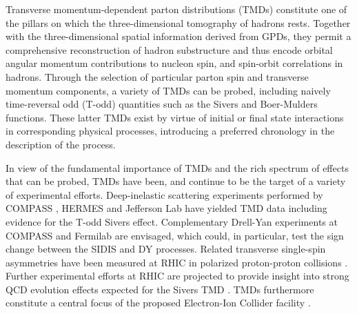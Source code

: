Transverse momentum-dependent parton distributions (TMDs) \cite{Boer:2011fh}
constitute one of the pillars on which the three-dimensional tomography of
hadrons rests. Together with the three-dimensional spatial information
derived from GPDs, they permit a
comprehensive reconstruction of hadron substructure and thus
encode %
orbital angular momentum contributions to nucleon spin, and
spin-orbit correlations in hadrons. Through the selection of
particular parton spin and transverse momentum components, a
variety of TMDs can be probed, including naively time-reversal odd
(T-odd) quantities such as the Sivers and Boer-Mulders functions.
These latter TMDs exist by virtue of initial or final state interactions
in corresponding physical processes, introducing a preferred chronology
in the description of the process.

In view of the fundamental importance of TMDs and the rich spectrum of
effects that can be probed, TMDs have been, and continue to be the
target of a variety of experimental efforts. Deep-inelastic scattering
experiments performed by COMPASS \cite{Alekseev:2008aa,Adolph:2014fjw},
HERMES \cite{Airapetian:2009ae,Airapetian:2013bim} and Jefferson Lab
\cite{Qian:2011py,Avakian:2010ae} have yielded TMD data including evidence
for the T-odd Sivers effect. Complementary Drell-Yan experiments at
COMPASS \cite{Gautheron:2010wva} and Fermilab \cite{Brown:2014sea} are
envisaged, which could, in particular, test the sign change between
the SIDIS and DY processes. Related transverse single-spin
asymmetries have been measured at RHIC in polarized proton-proton
collisions \cite{Adare:2013ekj,Adamczyk:2012xd}. Further experimental
efforts at RHIC are projected to provide insight into strong QCD evolution
effects expected for the Sivers TMD \cite{Echevarria:2014vda}.
TMDs furthermore constitute a central focus of the proposed Electron-Ion
Collider facility \cite{Accardi:2012qut}.

